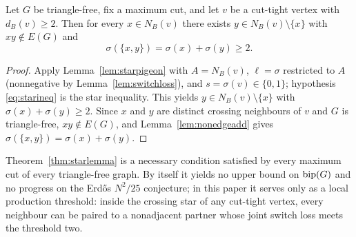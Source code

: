 \begin{theorem}\label{thm:starlemma}
Let \(G\) be triangle-free, fix a maximum cut, and let \(v\) be a
cut-tight vertex with \(d_B(v)\ge2\). Then for every \(x\in N_B(v)\)
there exists \(y\in N_B(v)\setminus\{x\}\) with \(xy\notin E(G)\) and
\[
 \sigma(\{x,y\})=\sigma(x)+\sigma(y)\ge2.
\]
\end{theorem}

\begin{proof}
Apply Lemma~\ref{lem:starpigeon} with \(A=N_B(v)\), \(\ell=\sigma\)
restricted to \(A\) (nonnegative by Lemma~\ref{lem:switchloss}), and
\(s=\sigma(v)\in\{0,1\}\); hypothesis \eqref{eq:starineq} is the star
inequality. This yields \(y\in N_B(v)\setminus\{x\}\) with
\(\sigma(x)+\sigma(y)\ge2\). Since \(x\) and \(y\) are distinct
crossing neighbours of \(v\) and \(G\) is triangle-free, \(xy\notin
E(G)\), and Lemma~\ref{lem:nonedgeadd} gives
\(\sigma(\{x,y\})=\sigma(x)+\sigma(y)\).
\end{proof}

\begin{remark}
Theorem~\ref{thm:starlemma} is a necessary condition satisfied by every
maximum cut of every triangle-free graph. By itself it yields no upper
bound on \(\operatorname{bip}(G)\) and no progress on the Erd\H os \(N^2/25\)
conjecture; in this paper it serves only as a local production
threshold: inside the crossing star of any cut-tight vertex, every
neighbour can be paired to a nonadjacent partner whose joint switch
loss meets the threshold two.
\end{remark}

